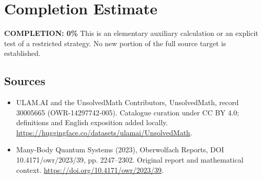 \documentclass[11pt]{article}
\begin{document}
\section{Completion Estimate}
\noindent\textbf{COMPLETION: 0\%}
This is an elementary auxiliary calculation or an explicit test of a restricted strategy. No new portion of the full source target is established.

\subsection{Sources}
\begin{itemize}
\item[\hypertarget{source:30005665:1}{S1}] ULAM.AI and the UnsolvedMath Contributors, UnsolvedMath, record 30005665 (OWR-14297742-005). Catalogue curation under CC BY 4.0; definitions and English exposition added locally.
\url{https://huggingface.co/datasets/ulamai/UnsolvedMath}.
\item[\hypertarget{source:30005665:2}{S2}] Many-Body Quantum Systems (2023), Oberwolfach Reports, DOI 10.4171/owr/2023/39, pp. 2247--2302. Original report and mathematical context.
\url{https://doi.org/10.4171/owr/2023/39}.
\end{itemize}
\label{end:30005665}
\end{document}
